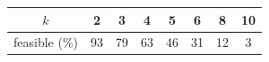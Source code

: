 \begin{tabular}{c|ccccccc}
$k$ & 2 & 3 & 4 & 5 & 6 & 8 & 10 \\
\hline
feasible (\%) & 93 & 79 & 63 & 46 & 31 & 12 & 3 \\
\end{tabular}